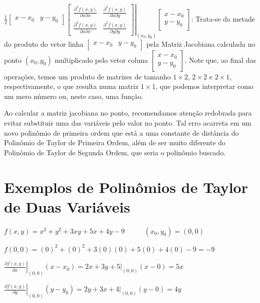 \documentclass[
  letterpaper,
  DIV=11,
  numbers=noendperiod]{scrreprt}
\begin{document}
\(\frac{1}{2} \begin{bmatrix} x-x_0 & y-y_0 \end{bmatrix}
\left. \begin{bmatrix} \frac{\partial^2{f(x,y)}}{\partial{x}\partial{x}} & \frac{\partial^2{f(x,y)}}{\partial{x}\partial{y}}\\
                \frac{\partial^2{f(x,y)}}{\partial{x}\partial{x}} & \frac{\partial^2{f(x,y)}}{\partial{y}\partial{y}} \end{bmatrix}\right |_{(x_0,y_0)}
\begin{bmatrix} x-x_0 \\ y-y_0 \end{bmatrix}\): Trata-se da metade do
produto do vetor linha \(\begin{bmatrix} x-x_0 & y-y_0 \end{bmatrix}\)
pela Matriz Jacobiana calculada no ponto \((x_0, y_0)\) multiplicado
pelo vetor coluna \(\begin{bmatrix} x-x_0 \\ y-y_0 \end{bmatrix}\). Note
que, ao final das operações, temos um produto de matrizes de tamanho
\(1 \times 2\), \(2 \times 2\) e \(2 \times 1\), respectivamente, o que
resulta numa matriz \(1 \times 1\), que podemos interpretar como um mero
número ou, neste caso, uma função.

Ao calcular a matriz jacobiana no ponto, recomendamos atenção redobrada
para evitar substituir uma das variáveis pelo valor no ponto. Tal erro
acarreta em um novo polinômio de primeira ordem que está a uma constante
de distância do Polinômio de Taylor de Primeira Ordem, além de ser muito
diferente do Polinômio de Taylor de Segunda Ordem, que seria o polinômio
buscado.

\section{Exemplos de Polinômios de Taylor de Duas
Variáveis}\label{exemplos-de-polinuxf4mios-de-taylor-de-duas-variuxe1veis}

\(f(x,y) = x^2+y^2+3xy+5x+4y-9 \phantom{---} (x_0,y_0) = (0,0)\)

\(f(0,0) = (0)^2+(0)^2+3(0)(0)+5(0)+4(0)-9=-9\)

\(\left. \frac{\partial f(x,y)}{\partial x} \right |_{(0,0)} (x-x_0) = \left. 2x+3y+5 \right |_{(0,0)}(x-0)=5x\)

\(\left. \frac{\partial f(x,y)}{\partial y} \right |_{(0,0)} (y-y_0) = \left. 2y+3x+4 \right |_{(0,0)}(y-0)=4y\)
\end{document}
